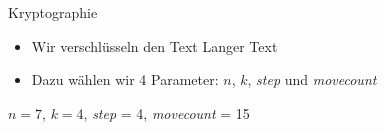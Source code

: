 \begin{frame}{Kryptographie}
    \begin{itemize}
        \item Wir verschlüsseln den Text \glqq Langer Text \grqq
        \item Dazu wählen wir 4 Parameter: $n$, $k$, \textit{step} und \textit{movecount}
    \end{itemize}
    \begin{myexample}
        $n=7$, $k=4$, \textit{step} = 4, \textit{movecount} = 15
    \end{myexample}
\end{frame}